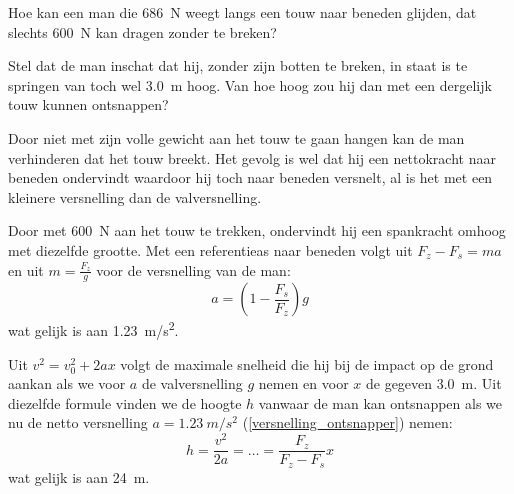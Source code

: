 
\begin{exercise}




Hoe kan een man die \SI{686}{N} weegt langs een touw naar beneden glijden, dat slechts \SI{600}{N} kan dragen zonder te breken?

Stel dat de man inschat dat hij, zonder zijn botten te breken, in staat is te springen van toch wel \SI{3,0}{m} hoog. Van hoe hoog zou hij dan met een dergelijk touw kunnen ontsnappen?



\begin{oplossing}
Door niet met zijn volle gewicht aan het touw te gaan hangen kan de man verhinderen dat het touw breekt. Het gevolg is wel dat hij een nettokracht naar beneden ondervindt waardoor hij toch naar beneden versnelt, al is het met een kleinere versnelling dan de valversnelling.

Door met \SI{600}{N} aan het touw te trekken, ondervindt hij een spankracht omhoog met diezelfde grootte. Met een referentieas naar beneden volgt uit $F_z-F_s=ma$ en uit $m=\frac{F_z}{g}$ voor de versnelling van de man:
\begin{equation}
	a=\left(1-\frac{F_s}{F_z}\right)g\label{versnelling_ontsnapper}
\end{equation}
wat gelijk is aan \SI{1,23}{m/s^2}.

Uit $v^2=v_0^2+2ax$ volgt de maximale snelheid die hij bij de impact op de grond aankan als we voor $a$ de valversnelling $g$ nemen en voor $x$ de gegeven \SI{3,0}{m}. Uit diezelfde formule vinden we de hoogte $h$ vanwaar de man kan ontsnappen als we nu de netto versnelling $a=\SI{1,23}{m/s^2}$ (\ref{versnelling_ontsnapper}) nemen: 
\begin{equation*}
	h=\frac{v^2}{2a}=\ldots=\frac{F_z}{F_z-F_s}x
\end{equation*}
wat gelijk is aan \SI{24}{m}.
\end{oplossing}

\end{exercise}
